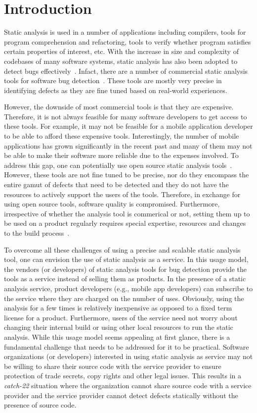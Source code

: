 \documentclass[twocolumn]{article}
\begin{document}
\section{Introduction}
Static analysis is used in a number of applications including compilers, tools for program comprehension
and refactoring, tools to verify whether program satisfies certain properties of interest, etc. 
With the increase in size and complexity of codebases of many software systems, static analysis 
has also been adopted to detect bugs effectively~\cite{billionlinesofcode}. Infact, there are a 
number of commercial static analysis tools for software bug detection~\cite{coverity, klocwork, parasoft}. 
These tools are mostly very precise in identifying defects as they are fine tuned based on real-world experiences. 

However, the downside of most commercial tools is that they are expensive. Therefore, it is not always 
feasible for many software developers to get access to these tools. For example, it may not be 
feasible for a mobile application developer to be able to afford these expensive tools. Interestingly, the
number of mobile applications has grown significantly in the recent past and many of them may 
not be able to make their software more reliable due to the expenses involved. 
To address this gap, one can potentially use open source static analysis tools~\cite{findbugs,saturn}. 
However, these tools are not fine tuned to be precise, nor do they encompass the entire gamut of defects 
that need to be detected and they do not have the resources to actively support the users of the tools. 
Therefore, in exchange for using open source tools, software quality is compromised.
Furthermore, irrespective of whether the analysis tool is commerical or not, 
setting them up to be used on a product regularly requires special expertise, resources 
and changes to the build process~\cite{fse13,billionlinesofcode}. 
 
To overcome all these challenges of using a precise and scalable static analysis tool, 
one can envision the use of static analysis as a service. In this usage model, 
the vendors (or developers) of static analysis tools for bug detection provide the tools 
as a service instead of selling them as products. In the presence of a static analysis 
service, product developers (e.g., mobile app developers) can subscribe to the service 
where they are charged on the number of uses. Obviously, using the analysis for a few times 
is relatively inexpensive as opposed to a fixed term license for a product. Furthermore, 
users of the service need not worry about changing their internal build or using other local resources 
to run the static analysis. While this usage model seems appealing at first glance, 
there is a fundamental challenge that needs to be addressed for it to be practical. 
Software organizations (or developers) interested in using static analysis as service 
may not be willing to share their source code with the service provider to ensure 
protection of trade secrets, copy rights and other legal issues. This results in a 
{\em catch-22} situation where the organization cannot share source code with 
a service provider and the service provider cannot detect defects statically without 
the presence of source code. 
\end{document}
